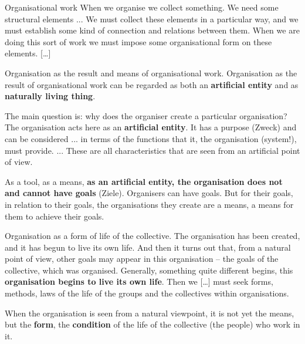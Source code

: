 \documentclass{beamer}
\begin{document}
\begin{frame}{Organisational work}
When we organise we collect something. We need some structural elements ...
We must collect these elements in a particular way, and we must establish some
kind of connection and relations between them. When we are doing this sort of
work we must impose some organisational form on these elements. [\ldots]

\end{frame}

\begin{frame}{Organisation as the result and means of organisational work.}
Organisation as the result of organisational work can be regarded as both an
\textbf{artificial entity} and as \textbf{naturally living thing}.

The main question is: why does the organiser create a particular organisation?
The organisation acts here as an \textbf{artificial entity}. It has a purpose
(Zweck) and can be considered ... in terms of the functions that it, the
organisation (system!), must provide. ... These are all characteristics that
are seen from an artificial point of view.

As a tool, as a means, \textbf{as an artificial entity, the organisation does
  not and cannot have goals} (Ziele). Organisers can have goals. But for their
goals, in relation to their goals, the organisations they create are a means,
a means for them to achieve their goals.

\end{frame}

\begin{frame}{Organisation as a form of life of the collective.}
The organisation has been created, and it has begun to live its own life. And
then it turns out that, from a natural point of view, other goals may appear
in this organisation – the goals of the collective, which was
organised. Generally, something quite different begins, this
\textbf{organisation begins to live its own life}. Then we [\ldots] must seek
forms, methods, laws of the life of the groups and the collectives within
organisations.

When the organisation is seen from a natural viewpoint, it is not yet the
means, but the \textbf{form}, the \textbf{condition} of the life of the
collective (the people) who work in it.

\end{frame}
\end{document}
